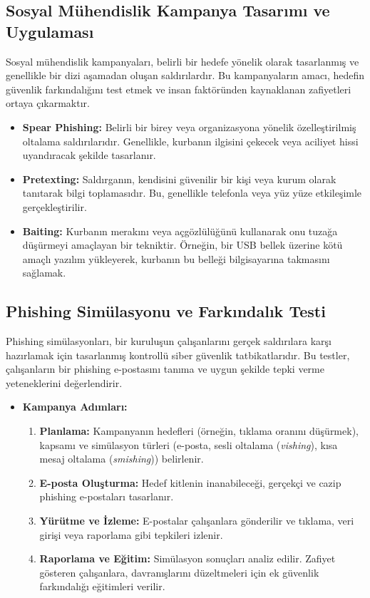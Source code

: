 \subsection{Sosyal Mühendislik Kampanya Tasarımı ve Uygulaması}

Sosyal mühendislik kampanyaları, belirli bir hedefe yönelik olarak tasarlanmış ve genellikle bir dizi aşamadan oluşan saldırılardır. Bu kampanyaların amacı, hedefin güvenlik farkındalığını test etmek ve insan faktöründen kaynaklanan zafiyetleri ortaya çıkarmaktır.

\begin{itemize}
\item \textbf{Spear Phishing:} Belirli bir birey veya organizasyona yönelik özelleştirilmiş oltalama saldırılarıdır. Genellikle, kurbanın ilgisini çekecek veya aciliyet hissi uyandıracak şekilde tasarlanır.
\item \textbf{Pretexting:} Saldırganın, kendisini güvenilir bir kişi veya kurum olarak tanıtarak bilgi toplamasıdır. Bu, genellikle telefonla veya yüz yüze etkileşimle gerçekleştirilir.
\item \textbf{Baiting:} Kurbanın merakını veya açgözlülüğünü kullanarak onu tuzağa düşürmeyi amaçlayan bir tekniktir. Örneğin, bir USB bellek üzerine kötü amaçlı yazılım yükleyerek, kurbanın bu belleği bilgisayarına takmasını sağlamak.
\end{itemize}

\subsection{Phishing Simülasyonu ve Farkındalık Testi}

Phishing simülasyonları, bir kuruluşun çalışanlarını gerçek saldırılara karşı hazırlamak için tasarlanmış kontrollü siber güvenlik tatbikatlarıdır. Bu testler, çalışanların bir phishing e-postasını tanıma ve uygun şekilde tepki verme yeteneklerini değerlendirir.

\begin{itemize}
\item \textbf{Kampanya Adımları:}
\begin{enumerate}
\item \textbf{Planlama:} Kampanyanın hedefleri (örneğin, tıklama oranını düşürmek), kapsamı ve simülasyon türleri (e-posta, sesli oltalama (\textit{vishing}), kısa mesaj oltalama (\textit{smishing})) belirlenir.
\item \textbf{E-posta Oluşturma:} Hedef kitlenin inanabileceği, gerçekçi ve cazip phishing e-postaları tasarlanır.
\item \textbf{Yürütme ve İzleme:} E-postalar çalışanlara gönderilir ve tıklama, veri girişi veya raporlama gibi tepkileri izlenir.
\item \textbf{Raporlama ve Eğitim:} Simülasyon sonuçları analiz edilir. Zafiyet gösteren çalışanlara, davranışlarını düzeltmeleri için ek güvenlik farkındalığı eğitimleri verilir.
\end{enumerate}
\end{itemize}


